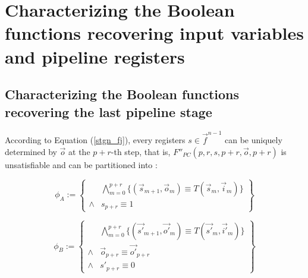 \documentclass[conference]{IEEEtran}
\begin{document}
% 
% 


\section{Characterizing the Boolean functions recovering input variables and pipeline registers}\label{sec_char}
\subsection{Characterizing the Boolean functions recovering the last pipeline stage}

According to Equation (\ref{stgn_fj}),
every registers $s\in \vec{f}^{n-1}$ can be uniquely determined by $\vec{o}$ at the $p+r$-th step,
that is,
$F''_{PC}(p,r,s,p+r,\vec{o},p+r)$ is unsatisfiable and can be partitioned into :

\begin{equation}
 \phi_A := 
 \left\{
\begin{array}{cc}
&\bigwedge_{m=0}^{p+r}
\{
(\vec{s}_{m+1},\vec{o}_m)\equiv T(\vec{s}_m,\vec{i}_m)
\}
\\
\wedge& s_{p+r}\equiv 1 
\end{array}
\right\}
\end{equation}

\begin{equation}
\phi_B := 
\left\{
\begin{array}{cc}
&\bigwedge_{m=0}^{p+r}
\{
(\vec{s'}_{m+1},\vec{o'}_m)\equiv T(\vec{s'}_m,\vec{i'}_m)
\}
\\
\wedge&\vec{o}_{p+r}\equiv \vec{o'}_{p+r} \\
\wedge& s'_{p+r}\equiv 0 
\end{array}
\right\}
\end{equation}
\end{document}
